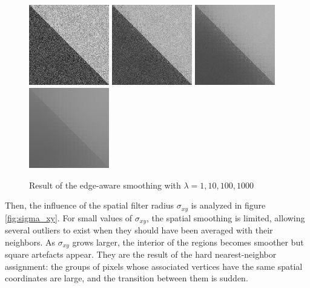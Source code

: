 \documentclass{article}
\begin{document}
\begin{figure}
    \centering
    \includegraphics[width=3.5cm]{../code/results/smoothing_diag_lambda_1_10_50_new.png}
    \includegraphics[width=3.5cm]{../code/results/smoothing_diag_lambda_10_10_50_new.png}
    \includegraphics[width=3.5cm]{../code/results/smoothing_diag_lambda_100_10_50_new.png}
    \includegraphics[width=3.5cm]{../code/results/smoothing_diag_lambda_1000_10_50_new.png}
    \caption{Result of the edge-aware smoothing with $\lambda = 1, 10, 100, 1000$}
    \label{fig:lambda}
\end{figure}

\medskip

Then, the influence of the spatial filter radius $\sigma_{xy}$ is analyzed in figure \ref{fig:sigma_xy}. For small values of $\sigma_{xy}$, the spatial smoothing is limited, allowing several outliers to exist when they should have been averaged with their neighbors. As $\sigma_{xy}$ grows larger, the interior of the regions becomes smoother but square artefacts appear. They are the result of the hard nearest-neighbor assignment: the groups of pixels whose associated vertices have the same spatial coordinates are large, and the transition between them is sudden.
\end{document}
